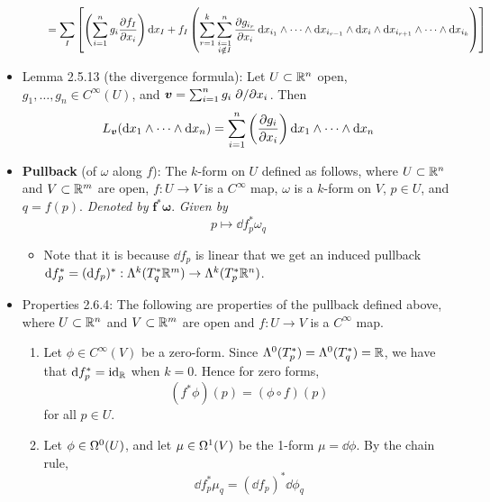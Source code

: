 \documentclass[../notes.tex]{subfiles}
\begin{document}
\begin{itemize}
\begin{itemize}
\begin{align*}
            &= \sum_I\left[ \left( \sum_{i=1}^ng_i\pdv{f_I}{x_i} \right)\dd{x_I}+f_I\left( \sum_{r=1}^k\sum_{\substack{i=1\\i\notin I}}^n\pdv{g_{i_r}}{x_i}\dd{x_{i_1}}\wedge\cdots\wedge\dd{x_{i_{r-1}}}\wedge\dd{x_i}\wedge\dd{x_{i_{r+1}}}\wedge\cdots\wedge\dd{x_{i_k}} \right) \right]
        \end{align*}
    \end{itemize}
    \item Lemma 2.5.13 (the divergence formula): Let $U\subset\R^n$ open, $g_1,\dots,g_n\in C^\infty(U)$, and $\bm{v}=\sum_{i=1}^ng_i\pdv*{x_i}$. Then
    \begin{equation*}
        L_{\bm{v}}(\dd{x_1}\wedge\cdots\wedge\dd{x_n}) = \sum_{i=1}^n\left( \pdv{g_i}{x_i} \right)\dd{x_1}\wedge\cdots\wedge\dd{x_n}
    \end{equation*}
    \item \textbf{Pullback} (of $\omega$ along $f$): The $k$-form on $U$ defined as follows, where $U\subset\R^n$ and $V\subset\R^m$ are open, $f:U\to V$ is a $C^\infty$ map, $\omega$ is a $k$-form on $V$, $p\in U$, and $q=f(p)$. \emph{Denoted by} $\bm{f^*\omega}$. \emph{Given by}
    \begin{equation*}
        p \mapsto \dd f_p^*\omega_q
    \end{equation*}
    \begin{itemize}
        \item Note that it is because $\dd f_p$ is linear that we get an induced pullback $\dd f_p^*=(\dd f_p)^*:\lam[k]{T_q^*\R^m}\to\lam[k]{T_p^*\R^n}$.
    \end{itemize}
    \item Properties 2.6.4: The following are properties of the pullback defined above, where $U\subset\R^n$ and $V\subset\R^m$ are open and $f:U\to V$ is a $C^\infty$ map.
    \begin{enumerate}
        \item Let $\phi\in C^\infty(V)$ be a zero-form. Since $\lam[0]{T_p^*}=\lam[0]{T_q^*}=\R$, we have that $\dd f_p^*=\id_\R$ when $k=0$. Hence for zero forms,
        \begin{equation*}
            (f^*\phi)(p) = (\phi\circ f)(p)
        \end{equation*}
        for all $p\in U$.
        \item Let $\phi\in\ome[0]{U}$, and let $\mu\in\ome[1]{V}$ be the 1-form $\mu=\dd\phi$. By the chain rule,
        \begin{equation*}
            \dd f_p^*\mu_q = (\dd f_p)^*\dd\phi_q

\end{equation*}
\end{enumerate}
\end{itemize}
\end{document}
